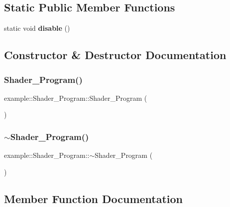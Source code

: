 \subsection*{Static Public Member Functions}
\begin{DoxyCompactItemize}
\item 
static void \textbf{ disable} ()
\end{DoxyCompactItemize}


\subsection{Constructor \& Destructor Documentation}
\mbox{\label{classexample_1_1_shader___program_aa76001651ab84fda3d899a2b57f2a4b3}} 
\subsubsection{Shader\_Program()}
{\footnotesize\ttfamily example\+::\+Shader\+\_\+\+Program\+::\+Shader\+\_\+\+Program (\begin{DoxyParamCaption}{ }\end{DoxyParamCaption})\hspace{0.3cm}{\ttfamily [inline]}}

\mbox{\label{classexample_1_1_shader___program_a39b461d067ffc3a10662e1d4fcb6d689}} 
\subsubsection{$\sim$Shader\_Program()}
{\footnotesize\ttfamily example\+::\+Shader\+\_\+\+Program\+::$\sim$\+Shader\+\_\+\+Program (\begin{DoxyParamCaption}{ }\end{DoxyParamCaption})\hspace{0.3cm}{\ttfamily [inline]}}



\subsection{Member Function Documentation}
\mbox{\label{classexample_1_1_shader___program_ab4b58aa69e6a4afc44e63a660b0e59b0}} 
